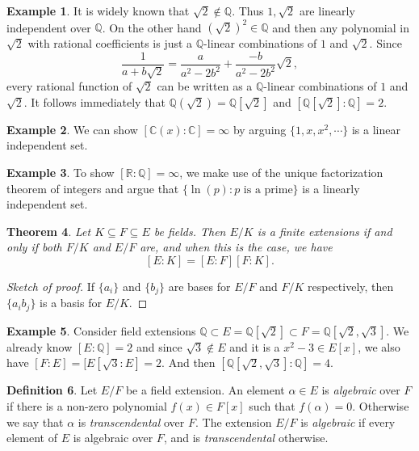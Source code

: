 \documentclass[12pt]{report}
\newtheorem{thm}{Theorem}[section]
\theoremstyle{definition}
\newtheorem{defn}[thm]{Definition}
\newtheorem{example}[thm]{Example}
\def\CC{\mathbb{C}}
\def\QQ{\mathbb{Q}}
\def\RR{\mathbb{R}}
\def\aa{\alpha}
\begin{document}
\begin{example}
    It is widely known that $\sqrt{2}\notin\QQ$. Thus $1,\sqrt{2}$ are linearly independent over $\QQ$. On the other hand $(\sqrt{2})^2\in \QQ$ and then any polynomial in $\sqrt{2}$ with rational coefficients is just a $\QQ$-linear combinations of $1$ and $\sqrt{2}$. Since $$\frac{1}{a+b\sqrt{2}} = \frac{a}{a^2-2b^2} +\frac{-b}{a^2-2b^2}\sqrt{2},$$ every rational function of $\sqrt{2}$ can be written as a $\QQ$-linear combinations of $1$ and $\sqrt{2}$. It follows immediately that $\QQ(\sqrt{2})=\QQ[\sqrt{2}]$ and $[\QQ[\sqrt{2}]:\QQ]=2$.  
\end{example}

\begin{example}
    We can show $[\CC(x):\CC]=\infty$ by arguing $\{1,x,x^2,\cdots\}$ is a linear independent set.
\end{example}

\begin{example}
    To show $[\RR:\QQ]=\infty$, we make use of the unique factorization theorem of integers and argue that $\{\ln(p): p \mbox{ is a prime}\}$ is a linearly independent set.
\end{example}

\begin{thm}
    Let $K\subseteq F\subseteq E$ be fields. Then $E/K$ is a finite extensions if and only if both $F/K$ and $E/F$  are, and when this is the case, we have $$[E:K]=[E:F][F:K].$$
\end{thm}

\begin{proof}[Sketch of proof]
    If $\{a_i\}$ and $\{b_j\}$ are bases for $E/F$ and $F/K$ respectively, then $\{a_ib_j\}$ is a basis for $E/K$.
\end{proof}

\begin{example}
    Consider field extensions $\QQ\subset E= \QQ[\sqrt{2}]\subset F=\QQ[\sqrt{2},\sqrt{3}]$. We already know $[E:\QQ]=2$ and since $\sqrt{3}\notin E$ and it is a $x^2-3\in E[x]$, we also have $[F:E]=[E[\sqrt{3}:E]=2$. And then $[\QQ[\sqrt{2},\sqrt{3}]:\QQ]=4$.
\end{example}

\begin{defn}
    Let $E/F$ be a field extension. An element $\aa\in E$ is \emph{algebraic} over $F$ if there is a non-zero polynomial $f(x) \in F[x]$ such that $f(\aa) = 0$. Otherwise we say that $\aa$ is \emph{transcendental} over $F$. The extension $E/F$ is \emph{algebraic} if every element of $E$ is algebraic over $F$, and is \emph{transcendental} otherwise.
\end{defn}
\end{document}
